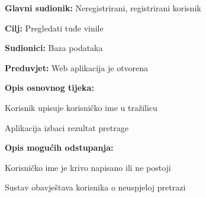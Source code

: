 				\noindent {}
					\begin{packed_item}
	
						\item \textbf{Glavni sudionik: }Neregistrirani, registrirani korisnik
						\item  \textbf{Cilj:} Pregledati tuđe vinile
						\item  \textbf{Sudionici:} Baza podataka
						\item  \textbf{Preduvjet:} Web aplikacija je otvorena
						\item  \textbf{Opis osnovnog tijeka:}
						
						\item[] \begin{packed_enum}
	
							\item Korisnik upisuje korisničko ime u tražilicu
							\item Aplikacija izbaci rezultat pretrage

						\end{packed_enum}
						
						\item  \textbf{Opis mogućih odstupanja:}
						
						\item[] \begin{packed_item}
	
							\item[2.a] Korisničko ime je krivo napisano ili ne postoji
								\begin{packed_item}
									\item Sustav obavještava korisnika o neuspjeloj pretrazi
								\end{packed_item}
							
						\end{packed_item}					
					\end{packed_item}
					
